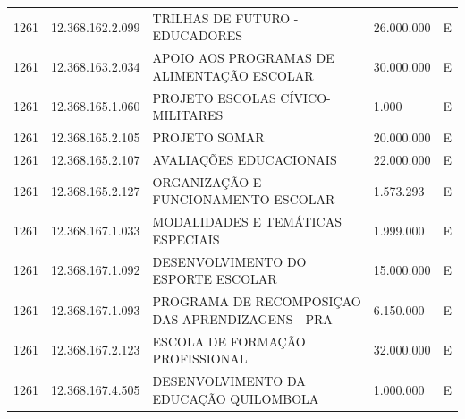 \documentclass{article}
\begin{document}
\begin{longtable}[c]{m{1cm}|m{2cm}|m{10cm}|m{2cm}|m{1cm}}
\multicolumn{1}{C{1cm}|}{1261} & \multicolumn{1}{C{2cm}|}{12.368.162.2.099} & \multicolumn{1}{L{10cm}|}{TRILHAS DE FUTURO - EDUCADORES} & \multicolumn{1}{R{2cm}|}{26.000.000} & \multicolumn{1}{C{1cm}}{E} \\
\multicolumn{1}{C{1cm}|}{1261} & \multicolumn{1}{C{2cm}|}{12.368.163.2.034} & \multicolumn{1}{L{10cm}|}{APOIO AOS PROGRAMAS DE ALIMENTAÇÃO ESCOLAR} & \multicolumn{1}{R{2cm}|}{30.000.000} & \multicolumn{1}{C{1cm}}{E} \\
\multicolumn{1}{C{1cm}|}{1261} & \multicolumn{1}{C{2cm}|}{12.368.165.1.060} & \multicolumn{1}{L{10cm}|}{PROJETO ESCOLAS CÍVICO-MILITARES} & \multicolumn{1}{R{2cm}|}{1.000} & \multicolumn{1}{C{1cm}}{E} \\
\multicolumn{1}{C{1cm}|}{1261} & \multicolumn{1}{C{2cm}|}{12.368.165.2.105} & \multicolumn{1}{L{10cm}|}{PROJETO SOMAR} & \multicolumn{1}{R{2cm}|}{20.000.000} & \multicolumn{1}{C{1cm}}{E} \\
\multicolumn{1}{C{1cm}|}{1261} & \multicolumn{1}{C{2cm}|}{12.368.165.2.107} & \multicolumn{1}{L{10cm}|}{AVALIAÇÕES EDUCACIONAIS} & \multicolumn{1}{R{2cm}|}{22.000.000} & \multicolumn{1}{C{1cm}}{E} \\
\multicolumn{1}{C{1cm}|}{1261} & \multicolumn{1}{C{2cm}|}{12.368.165.2.127} & \multicolumn{1}{L{10cm}|}{ORGANIZAÇÃO E FUNCIONAMENTO ESCOLAR} & \multicolumn{1}{R{2cm}|}{1.573.293} & \multicolumn{1}{C{1cm}}{E} \\
\multicolumn{1}{C{1cm}|}{1261} & \multicolumn{1}{C{2cm}|}{12.368.167.1.033} & \multicolumn{1}{L{10cm}|}{MODALIDADES E TEMÁTICAS ESPECIAIS} & \multicolumn{1}{R{2cm}|}{1.999.000} & \multicolumn{1}{C{1cm}}{E} \\
\multicolumn{1}{C{1cm}|}{1261} & \multicolumn{1}{C{2cm}|}{12.368.167.1.092} & \multicolumn{1}{L{10cm}|}{DESENVOLVIMENTO DO ESPORTE ESCOLAR} & \multicolumn{1}{R{2cm}|}{15.000.000} & \multicolumn{1}{C{1cm}}{E} \\
\multicolumn{1}{C{1cm}|}{1261} & \multicolumn{1}{C{2cm}|}{12.368.167.1.093} & \multicolumn{1}{L{10cm}|}{PROGRAMA DE RECOMPOSIÇAO DAS APRENDIZAGENS - PRA} & \multicolumn{1}{R{2cm}|}{6.150.000} & \multicolumn{1}{C{1cm}}{E} \\
\multicolumn{1}{C{1cm}|}{1261} & \multicolumn{1}{C{2cm}|}{12.368.167.2.123} & \multicolumn{1}{L{10cm}|}{ESCOLA DE FORMAÇÃO PROFISSIONAL} & \multicolumn{1}{R{2cm}|}{32.000.000} & \multicolumn{1}{C{1cm}}{E} \\
\multicolumn{1}{C{1cm}|}{1261} & \multicolumn{1}{C{2cm}|}{12.368.167.4.505} & \multicolumn{1}{L{10cm}|}{DESENVOLVIMENTO DA EDUCAÇÃO QUILOMBOLA} & \multicolumn{1}{R{2cm}|}{1.000.000} & \multicolumn{1}{C{1cm}}{E} \\

\end{longtable}
\end{document}
